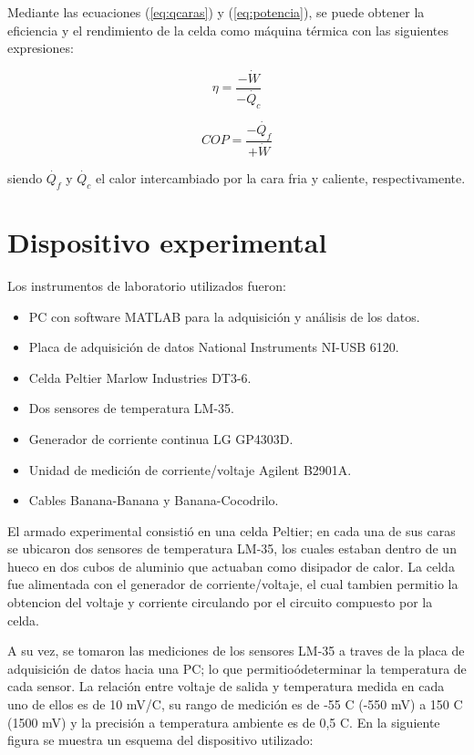 \documentclass[twoside,twocolumn,a4paper]{article}
\begin{document}
Mediante las ecuaciones (\ref{eq:qcaras}) y (\ref{eq:potencia}), se puede obtener la eficiencia y el rendimiento de la celda como m\'aquina t\'ermica con las siguientes expresiones:


\begin{equation}
\label{eq:eficiencia}
\eta = \frac{-\dot{W}}{-\dot{Q_{c}}}
\end{equation}

\begin{equation}
\label{eq:rendimiento}
COP = \frac{-\dot{Q_{f}}}{+\dot{W}}
\end{equation}

siendo $\dot{Q_{f}}$ y $\dot{Q_{c}}$ el calor intercambiado por la cara fria y caliente, respectivamente.




\section{Dispositivo experimental}

Los instrumentos de laboratorio utilizados fueron:
\begin{itemize}
\item PC con software MATLAB para la adquisici\'on y an\'alisis de los datos.
\item Placa de adquisici\'on de datos National Instruments NI-USB 6120.
\item Celda Peltier Marlow Industries DT3-6.
\item Dos sensores de temperatura LM-35.
\item Generador de corriente continua LG GP4303D.
\item Unidad de medici\'on de corriente/voltaje Agilent B2901A.
\item Cables Banana-Banana y Banana-Cocodrilo.
\end{itemize}





El armado experimental consisti\'o en una celda Peltier; en cada una de sus caras se ubicaron dos sensores de temperatura LM-35, los cuales estaban dentro de un hueco en dos cubos de aluminio que actuaban como disipador de calor. La celda fue alimentada con el generador de corriente/voltaje, el cual tambien permitio la obtencion del voltaje y corriente circulando por el circuito compuesto por la celda.

A su vez, se tomaron las mediciones de los sensores LM-35 a traves de la placa de adquisici\'on de datos hacia una PC; lo que permitio\'odeterminar la temperatura de cada sensor. La relaci\'on entre voltaje de salida y temperatura medida en cada uno de ellos es de 10 mV/\degree C, su rango de medici\'on es de -55 \degree C (-550 mV) a 150 \degree C (1500 mV) y la precisi\'on a temperatura ambiente es de 0,5 \degree C. En la siguiente figura se muestra un esquema del dispositivo utilizado:
\end{document}
